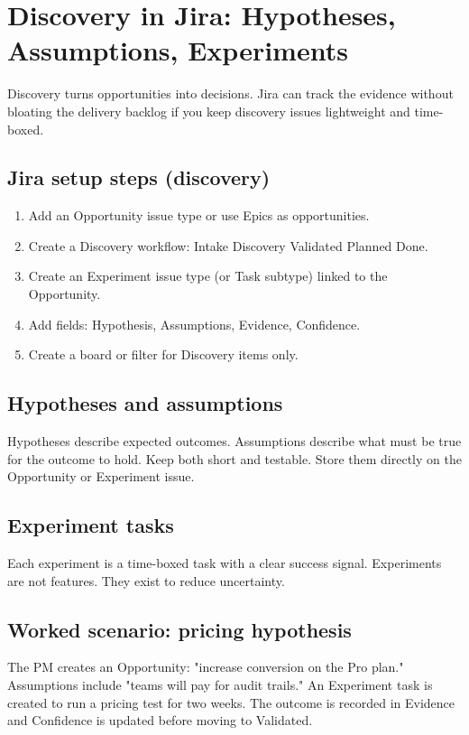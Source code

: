 \section{Discovery in Jira: Hypotheses, Assumptions, Experiments}
Discovery turns opportunities into decisions. Jira can track the evidence without bloating the delivery backlog if you keep discovery issues lightweight and time-boxed.

\subsection{Jira setup steps (discovery)}
\begin{enumerate}
  \item Add an Opportunity issue type or use Epics as opportunities.
  \item Create a Discovery workflow: Intake \textrightarrow{} Discovery \textrightarrow{} Validated \textrightarrow{} Planned \textrightarrow{} Done.
  \item Create an Experiment issue type (or Task subtype) linked to the Opportunity.
  \item Add fields: Hypothesis, Assumptions, Evidence, Confidence.
  \item Create a board or filter for Discovery items only.
\end{enumerate}

\subsection{Hypotheses and assumptions}
Hypotheses describe expected outcomes. Assumptions describe what must be true for the outcome to hold. Keep both short and testable. Store them directly on the Opportunity or Experiment issue.

\subsection{Experiment tasks}
Each experiment is a time-boxed task with a clear success signal. Experiments are not features. They exist to reduce uncertainty.

\subsection{Worked scenario: pricing hypothesis}
The PM creates an Opportunity: "increase conversion on the Pro plan." Assumptions include "teams will pay for audit trails." An Experiment task is created to run a pricing test for two weeks. The outcome is recorded in Evidence and Confidence is updated before moving to Validated.

